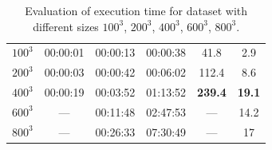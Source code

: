 \begin{table}[h]
{\begin{tabular}{c|c|c|c|cc}
			$100^3$                                                                                 & 00:00:01                                                   & 00:00:13                                                      & 00:00:38                                              & \multicolumn{1}{c|}{41.8}                                                        & 2.9                                                            \\
			$200^3$                                                                                 & 00:00:03                                                   & 00:00:42                                                      & 00:06:02                                              & \multicolumn{1}{c|}{112.4}                                                       & 8.6                                                            \\
			$400^3$                                                                                 & 00:00:19                                                   & 00:03:52                                                      & 01:13:52                                              & \multicolumn{1}{c|}{\textbf{239.4}}                                                       & \textbf{19.1}                                                           \\
			$600^3$                                                                                 & ---                                                        & 00:11:48                                                      & 02:47:53                                              & \multicolumn{1}{c|}{---}                                                        & 14.2                                                            \\
			$800^3$                                                                                 & ---                                                        & 00:26:33                                                      & 07:30:49                                              & \multicolumn{1}{c|}{---}                                                        & 17                                                           
		\end{tabular}
	}
	\caption{Evaluation of execution time for dataset with different sizes $100^3$, $200^3$, $400^3$, $600^3$, $800^3$.}
	\label{tb:perf-time}
\end{table}

